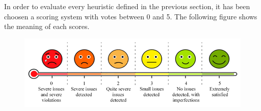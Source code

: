 In order to evaluate every heuristic defined in the previous section, it has been choosen a scoring system with votes between 0 and 5. The following figure shows the meaning of each scores. 
\begin{figure}[h!]
	\centering
 	\begin{minipage}[b]{1\textwidth}
    		\includegraphics[width=\textwidth]{./assets/scoring.png}
	\end{minipage}
\end{figure}
\FloatBarrier